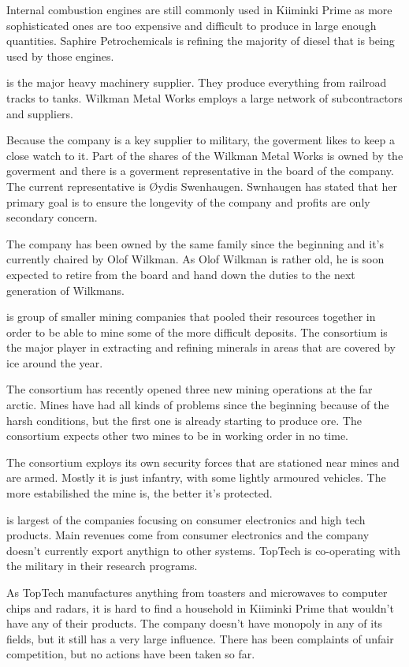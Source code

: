 \documentclass{tufte-book}
\begin{document}
Internal combustion engines are still commonly used in Kiiminki Prime as
more sophisticated ones are too expensive and difficult to produce in large
enough quantities. Saphire Petrochemicals is refining the majority of diesel
that is being used by those engines.

 is the major heavy machinery supplier. They
produce everything from railroad tracks to tanks. Wilkman Metal Works employs
a large network of subcontractors and suppliers.

Because the company is a key supplier to military, the goverment likes to
keep a close watch to it. Part of the shares of the Wilkman Metal Works is
owned by the goverment and there is a goverment representative in the board
of the company. The current representative is \O ydis Swenhaugen. Swnhaugen
has stated that her primary goal is to ensure the longevity of the company
and profits are only secondary concern.

The company has been owned by the same family since the beginning and it's
currently chaired by Olof Wilkman. As Olof Wilkman is rather old, he is soon
expected to retire from the board and hand down the duties to the next
generation of Wilkmans.

 is group of smaller mining companies that
pooled their resources together in order to be able to mine some of the
more difficult deposits. The consortium is the major player in extracting and
refining minerals in areas that are covered by ice around the year.

The consortium has recently opened three new mining operations at the far
arctic. Mines have had all kinds of problems since the beginning because of
the harsh conditions, but the first one is already starting to produce ore.
The consortium expects other two mines to be in working order in no time.

The consortium exploys its own security forces that are stationed near mines
and are armed. Mostly it is just infantry, with some lightly armoured
vehicles. The more estabilished the mine is, the better it's protected.

 is largest of the companies focusing on consumer
electronics and high tech products. Main revenues come from consumer
electronics and the company doesn't currently export anythign to other
systems. TopTech is co-operating with the military in their research
programs.

As TopTech manufactures anything from toasters and microwaves to computer
chips and radars, it is hard to find a household in Kiiminki Prime that
wouldn't have any of their products. The company doesn't have monopoly in any
of its fields, but it still has a very large influence. There has been
complaints of unfair competition, but no actions have been taken so far.
\end{document}

